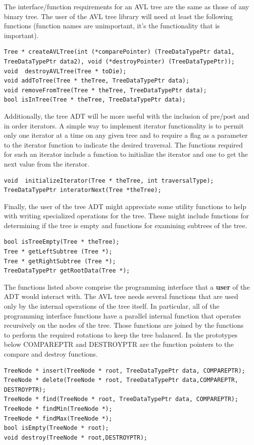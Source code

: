The interface/function requirements for an AVL tree are the same as those of any binary tree. The user of the AVL tree library will need at least the following functions (function names are unimportant, it's the functionality that is important).
\begin{verbatim}
Tree * createAVLTree(int (*comparePointer) (TreeDataTypePtr data1, TreeDataTypePtr data2), void (*destroyPointer) (TreeDataTypePtr));
void  destroyAVLTree(Tree * toDie);
void addToTree(Tree * theTree, TreeDataTypePtr data);
void removeFromTree(Tree * theTree, TreeDataTypePtr data);
bool isInTree(Tree * theTree, TreeDataTypePtr data);\end{verbatim}

Additionally, the tree ADT will be more useful with the inclusion of pre/post and in order iterators. A simple way to implement iterator functionality is to permit only one iterator at a time on any given tree and to require a flag as a parameter to the iterator function to indicate the desired traversal. The functions required for such an iterator include a function to initialize the iterator and one to get the next value from the iterator.
\begin{verbatim}
void  initializeIterator(Tree * theTree, int traversalType);
TreeDataTypePtr interatorNext(Tree *theTree);\end{verbatim}

Finally, the user of the tree ADT might appreciate some utility functions to help with writing specialized operations for the tree. These might include functions for determining if the tree is empty and functions for examining subtrees of the tree.
\begin{verbatim}
bool isTreeEmpty(Tree * theTree);
Tree * getLeftSubtree (Tree *);
Tree * getRightSubtree (Tree *);
TreeDataTypePtr getRootData(Tree *);\end{verbatim}

The functions listed above comprise the programming interface that a \textbf{user} of the ADT would interact with. The AVL tree needs several functions that are used only by the internal operations of the tree itself. In particular, all of the programming interface functions have a parallel internal function that operates recursively on the nodes of the tree. Those functions are joined by the functions to perform the required rotations to keep the tree balanced. In the prototypes below COMPAREPTR and DESTROYPTR are the function pointers to the compare and destroy functions.
\begin{verbatim}
TreeNode * insert(TreeNode * root, TreeDataTypePtr data, COMPAREPTR);
TreeNode * delete(TreeNode * root, TreeDataTypePtr data,COMPAREPTR, DESTROYPTR);
TreeNode * find(TreeNode * root, TreeDataTypePtr data, COMPAREPTR);
TreeNode * findMin(TreeNode *);
TreeNode * findMax(TreeNode *);
bool isEmpty(TreeNode * root);
void destroy(TreeNode * root,DESTROYPTR);
  \end{verbatim}
 
